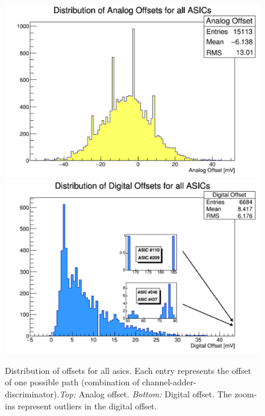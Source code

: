\documentclass[main.tex]{subfiles}
\begin{document}
\begin{figure}
  \centering
    \includegraphics[width=\textwidth]{./Pictures/analogdist.pdf}\\
  \endminipage
    \includegraphics[width=\textwidth]{./Pictures/digitaldist.pdf}
  \endminipage
  \caption{Distribution of offsets for all \glspl{asic}. Each entry represents the offset of one possible path (combination of channel-adder-discriminator).\textit{Top:} Analog offset. \textit{Bottom:} Digital offset. The zoom-ins represent outliers in the digital offset.}
  \label{fig:offsetdist}
\end{figure}
\end{document}
